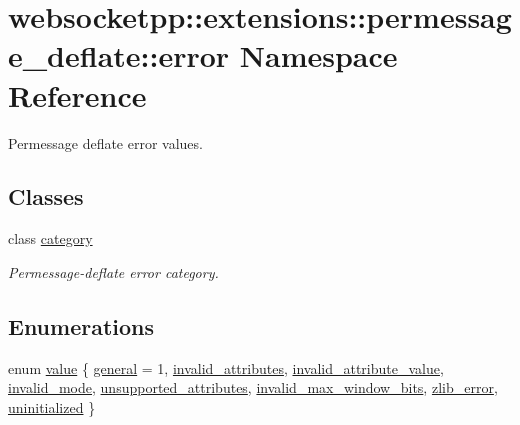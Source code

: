 \hypertarget{namespacewebsocketpp_1_1extensions_1_1permessage__deflate_1_1error}{}\section{websocketpp\+:\+:extensions\+:\+:permessage\+\_\+deflate\+:\+:error Namespace Reference}
\label{namespacewebsocketpp_1_1extensions_1_1permessage__deflate_1_1error}


Permessage deflate error values.  


\subsection*{Classes}
\begin{DoxyCompactItemize}
\item 
class \mbox{\hyperlink{classwebsocketpp_1_1extensions_1_1permessage__deflate_1_1error_1_1category}{category}}
\begin{DoxyCompactList}\small\item\em Permessage-\/deflate error category. \end{DoxyCompactList}\end{DoxyCompactItemize}
\subsection*{Enumerations}
\begin{DoxyCompactItemize}
\item 
enum \mbox{\hyperlink{namespacewebsocketpp_1_1extensions_1_1permessage__deflate_1_1error_a38e53d7586dd60059cc99a5833bbe54e}{value}} \{ \newline
\mbox{\hyperlink{namespacewebsocketpp_1_1extensions_1_1permessage__deflate_1_1error_a38e53d7586dd60059cc99a5833bbe54eaea6d6b0b77348e739b118910c74b1ee0}{general}} = 1, 
\mbox{\hyperlink{namespacewebsocketpp_1_1extensions_1_1permessage__deflate_1_1error_a38e53d7586dd60059cc99a5833bbe54eae5f446fcc9f28756b471d89e879f7670}{invalid\+\_\+attributes}}, 
\mbox{\hyperlink{namespacewebsocketpp_1_1extensions_1_1permessage__deflate_1_1error_a38e53d7586dd60059cc99a5833bbe54ea5554d2f18722ee4c2a4c58bf7ffae079}{invalid\+\_\+attribute\+\_\+value}}, 
\mbox{\hyperlink{namespacewebsocketpp_1_1extensions_1_1permessage__deflate_1_1error_a38e53d7586dd60059cc99a5833bbe54eafc842b4166ec4bf89c14154581fa2a63}{invalid\+\_\+mode}}, 
\newline
\mbox{\hyperlink{namespacewebsocketpp_1_1extensions_1_1permessage__deflate_1_1error_a38e53d7586dd60059cc99a5833bbe54ea07d85052b0885acaa098a7fe3d8f7bee}{unsupported\+\_\+attributes}}, 
\mbox{\hyperlink{namespacewebsocketpp_1_1extensions_1_1permessage__deflate_1_1error_a38e53d7586dd60059cc99a5833bbe54ea23eace97896da0a8136d213fb1e4e987}{invalid\+\_\+max\+\_\+window\+\_\+bits}}, 
\mbox{\hyperlink{namespacewebsocketpp_1_1extensions_1_1permessage__deflate_1_1error_a38e53d7586dd60059cc99a5833bbe54ea9c98b21e33391203ce5f968428c03f3a}{zlib\+\_\+error}}, 
\mbox{\hyperlink{namespacewebsocketpp_1_1extensions_1_1permessage__deflate_1_1error_a38e53d7586dd60059cc99a5833bbe54eaa7d37064915d0ef64357e41763b42b7e}{uninitialized}}
 \}
\end{DoxyCompactItemize}

